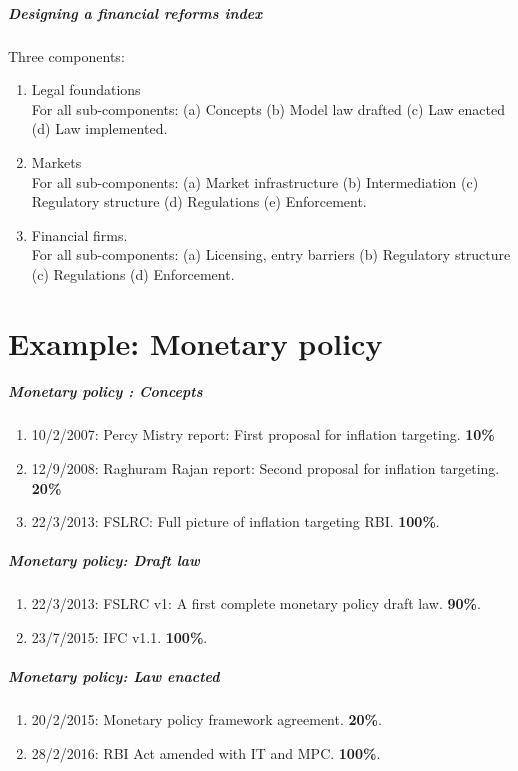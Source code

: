 \documentclass{beamer}
\newcommand{\fullpage}[1]{
\part{#1}
\begin{frame}
  \partpage
\end{frame}
}
\begin{document}
\begin{frame}
  \frametitle{Designing a financial reforms index}
  Three components:

  \begin{enumerate}
  \item Legal foundations \\
    For all sub-components: (a) Concepts (b) Model law drafted (c) Law
    enacted (d) Law implemented.
  \item Markets \\
    For all sub-components: (a) Market infrastructure (b)
    Intermediation (c) Regulatory structure (d) Regulations (e)
    Enforcement.
  \item Financial firms. \\
    For all sub-components: (a) Licensing, entry barriers (b)
    Regulatory structure (c) Regulations (d) Enforcement.
  \end{enumerate}
\end{frame}

\fullpage{Example: Monetary policy}

\begin{frame}
  \frametitle{Monetary policy : Concepts}
  \begin{enumerate}
  \item 10/2/2007: Percy Mistry report: First proposal for inflation
    targeting. \textbf{10\%}
  \item 12/9/2008: Raghuram Rajan report: Second proposal for
    inflation targeting. \textbf{20\%}
  \item 22/3/2013: FSLRC: Full picture of inflation targeting
    RBI. \textbf{100\%}.
  \end{enumerate}
\end{frame}

\begin{frame}
  \frametitle{Monetary policy: Draft law}
  \begin{enumerate}
  \item 22/3/2013: FSLRC v1: A first complete monetary policy draft
    law. \textbf{90\%}.
  \item 23/7/2015: IFC v1.1. \textbf{100\%}.
  \end{enumerate}
\end{frame}

\begin{frame}
  \frametitle{Monetary policy: Law enacted}
  \begin{enumerate}
  \item 20/2/2015: Monetary policy framework agreement. \textbf{20\%}.
  \item 28/2/2016: RBI Act amended with IT and MPC. \textbf{100\%}.
  \end{enumerate}
\end{frame}
\end{document}
